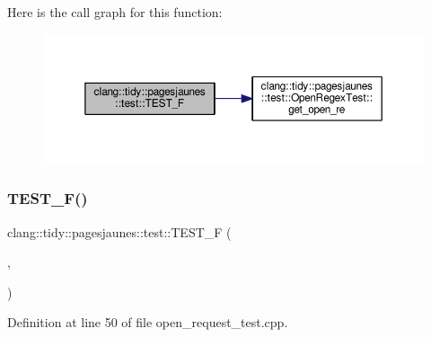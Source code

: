 Here is the call graph for this function\+:
\nopagebreak
\begin{figure}[H]
\begin{center}
\leavevmode
\includegraphics[width=350pt]{namespaceclang_1_1tidy_1_1pagesjaunes_1_1test_a6a10a0e5bc2065fff16057f836ffcb48_cgraph}
\end{center}
\end{figure}
\mbox{\label{namespaceclang_1_1tidy_1_1pagesjaunes_1_1test_a7afb641ccb9e19a037895b9246bfeeb5}} 
\subsubsection{\texorpdfstring{T\+E\+S\+T\+\_\+\+F()}{TEST\_F()}\hspace{0.1cm}{\footnotesize\ttfamily [17/57]}}
{\footnotesize\ttfamily clang\+::tidy\+::pagesjaunes\+::test\+::\+T\+E\+S\+T\+\_\+F (\begin{DoxyParamCaption}\item[{\hyperlink{classclang_1_1tidy_1_1pagesjaunes_1_1test_1_1_open_request_test}{Open\+Request\+Test}}]{,  }\item[{Request\+Decode}]{ }\end{DoxyParamCaption})}



Definition at line 50 of file open\+\_\+request\+\_\+test.\+cpp.

